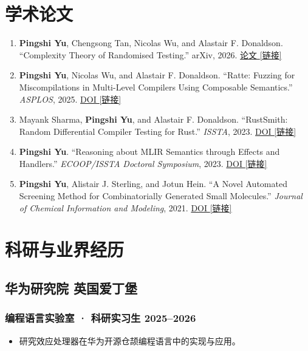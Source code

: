 \documentclass[11pt]{article}
\newcommand{\rside}[1]{\hfill {\normalfont\color{accent} #1}}
\newcommand{\linkicon}{{\color{gray}\footnotesize[链接]}}
\begin{document}
\section{学术论文}

\begin{enumerate}
  \item \textbf{Pingshi Yu}, Chengsong Tan, Nicolas Wu, and Alastair F. Donaldson. ``Complexity Theory of Randomised Testing.'' arXiv, 2026. \href{https://arxiv.org/abs/2607.11811}{论文 \linkicon}
  \item \textbf{Pingshi Yu}, Nicolas Wu, and Alastair F. Donaldson. ``Ratte: Fuzzing for Miscompilations in Multi-Level Compilers Using Composable Semantics.'' \textit{ASPLOS}, 2025. \href{https://doi.org/10.1145/3676641.3716270}{DOI \linkicon}
  \item Mayank Sharma, \textbf{Pingshi Yu}, and Alastair F. Donaldson. ``RustSmith: Random Differential Compiler Testing for Rust.'' \textit{ISSTA}, 2023. \href{https://doi.org/10.1145/3597926.3604919}{DOI \linkicon}
  \item \textbf{Pingshi Yu}. ``Reasoning about MLIR Semantics through Effects and Handlers.'' \textit{ECOOP/ISSTA Doctoral Symposium}, 2023. \href{https://doi.org/10.1145/3597926.3605239}{DOI \linkicon}
  \item \textbf{Pingshi Yu}, Alistair J. Sterling, and Jotun Hein. ``A Novel Automated Screening Method for Combinatorially Generated Small Molecules.'' \textit{Journal of Chemical Information and Modeling}, 2021. \href{https://doi.org/10.1021/acs.jcim.0c01462}{DOI \linkicon}
\end{enumerate}

\section{科研与业界经历}

\subsection{华为研究院 \rside{英国爱丁堡}}
\subsubsection{编程语言实验室 · 科研实习生 \rside{2025--2026}}
\begin{itemize}
  \item 研究效应处理器在华为开源仓颉编程语言中的实现与应用。
\end{itemize}
\end{document}
